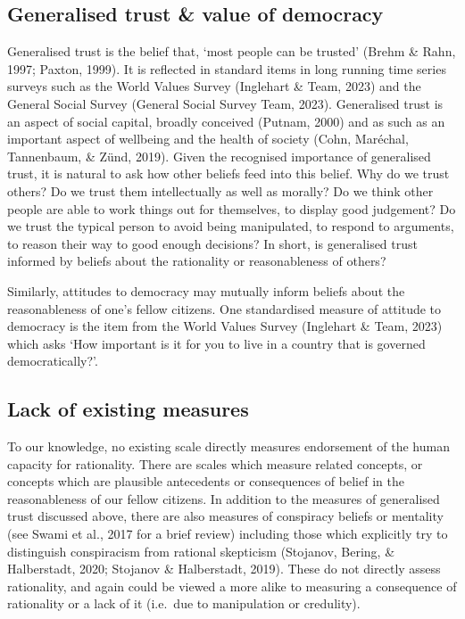 \documentclass[
  ,jou,floatsintext]{apa6}
\begin{document}
\hypertarget{generalised-trust-value-of-democracy}{%
\subsection{Generalised trust \& value of democracy}\label{generalised-trust-value-of-democracy}}

Generalised trust is the belief that, `most people can be trusted' (Brehm \& Rahn, 1997; Paxton, 1999). It is reflected in standard items in long running time series surveys such as the World Values Survey (Inglehart \& Team, 2023) and the General Social Survey (General Social Survey Team, 2023). Generalised trust is an aspect of social capital, broadly conceived (Putnam, 2000) and as such as an important aspect of wellbeing and the health of society (Cohn, Maréchal, Tannenbaum, \& Zünd, 2019). Given the recognised importance of generalised trust, it is natural to ask how other beliefs feed into this belief. Why do we trust others? Do we trust them intellectually as well as morally? Do we think other people are able to work things out for themselves, to display good judgement? Do we trust the typical person to avoid being manipulated, to respond to arguments, to reason their way to good enough decisions? In short, is generalised trust informed by beliefs about the rationality or reasonableness of others?

Similarly, attitudes to democracy may mutually inform beliefs about the reasonableness of one's fellow citizens. One standardised measure of attitude to democracy is the item from the World Values Survey (Inglehart \& Team, 2023) which asks `How important is it for you to live in a country that is governed democratically?'.

\hypertarget{lack-of-existing-measures}{%
\subsection{Lack of existing measures}\label{lack-of-existing-measures}}

To our knowledge, no existing scale directly measures endorsement of the human capacity for rationality. There are scales which measure related concepts, or concepts which are plausible antecedents or consequences of belief in the reasonableness of our fellow citizens. In addition to the measures of generalised trust discussed above, there are also measures of conspiracy beliefs or mentality (see Swami et al., 2017 for a brief review) including those which explicitly try to distinguish conspiracism from rational skepticism (Stojanov, Bering, \& Halberstadt, 2020; Stojanov \& Halberstadt, 2019). These do not directly assess rationality, and again could be viewed a more alike to measuring a consequence of rationality or a lack of it (i.e.~due to manipulation or credulity).
\end{document}
